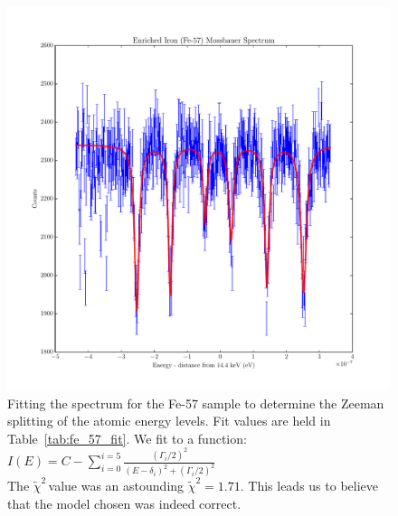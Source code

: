 \documentclass[reprint, nobibnotes, amssymb, amsmath, amsfonts, mathtools, mathrsfs, floatfix]{revtex4-1}
\newcommand{\redchi}{$\tilde{\chi}^2\,$}
\begin{document}
\begin{widetext}
      \begin{figure}[h]
        \centering
        \includegraphics[width=\linewidth]{../plots/fe_fit.pdf}
        \caption{Fitting the spectrum for the Fe-57 sample to determine the Zeeman splitting of the atomic energy levels.  Fit values are held in Table~\ref{tab:fe_57_fit}.  We fit to a function: \\
          $I(E) = C - \sum\limits_{i = 0}^{i = 5}{ \frac{(\Gamma_i/2)^2}{(E-\delta_i)^2 + (\Gamma_i/2)^2} }$ \\
        The \redchi value was an astounding $\tilde{\chi}^2 = 1.71$.  This leads us to believe that the model chosen was indeed correct.~\label{fe_fit}}
      \end{figure}


\end{widetext}
\end{document}
